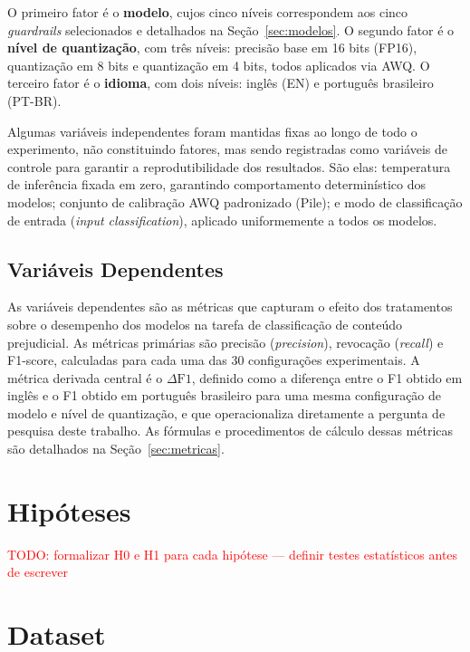 O primeiro fator é o \textbf{modelo}, cujos cinco níveis correspondem aos cinco \textit{guardrails} selecionados e detalhados na Seção~\ref{sec:modelos}. O segundo fator é o \textbf{nível de quantização}, com três níveis: precisão base em 16 bits (FP16), quantização em 8 bits e quantização em 4 bits, todos aplicados via AWQ. O terceiro fator é o \textbf{idioma}, com dois níveis: inglês (EN) e português brasileiro (PT-BR).

Algumas variáveis independentes foram mantidas fixas ao longo de todo o experimento, 
não constituindo fatores, mas sendo registradas como variáveis de controle para 
garantir a reprodutibilidade dos resultados. São elas: temperatura de inferência 
fixada em zero, garantindo comportamento determinístico dos modelos; conjunto de 
calibração AWQ padronizado (Pile); e modo de classificação de entrada 
(\textit{input classification}), aplicado uniformemente a todos os modelos.

\subsection{Variáveis Dependentes}
\label{sec:variaveis}
As variáveis dependentes são as métricas que capturam o efeito dos tratamentos sobre o desempenho dos modelos na tarefa de classificação de conteúdo prejudicial. As métricas primárias são precisão (\textit{precision}), revocação (\textit{recall}) e F1-score, calculadas para cada uma das 30 configurações experimentais. A métrica derivada central é o $\Delta\text{F1}$, definido como a diferença entre o F1 obtido em inglês e o F1 obtido em português brasileiro para uma mesma configuração de modelo e nível de quantização, e que operacionaliza diretamente a pergunta de pesquisa deste trabalho. As fórmulas e procedimentos de cálculo dessas métricas são detalhados na Seção~\ref{sec:metricas}.


\section{Hipóteses}
\label{sec:hipoteses}
\textcolor{red}{TODO: formalizar H0 e H1 para cada hipótese — definir testes estatísticos antes de escrever}

\section{Dataset}
\label{sec:dataset}

